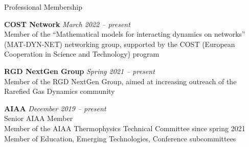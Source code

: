 \documentclass{resume} %
\begin{document}
\begin{rSection}{Professional Membership}


{\bf COST Network} \hfill {\em March 2022 -- present} \\ 
Member of the ``Mathematical models for interacting dynamics on networks'' (MAT-DYN-NET) networking group, supported by the COST (European Cooperation in Science and Technology) program


{\bf RGD NextGen Group} \hfill {\em Spring 2021 -- present} \\ 
Member of the RGD NextGen Group, aimed at increasing outreach of the Rarefied Gas Dynamics community

{\bf AIAA} \hfill {\em December 2019 -- present} \\ 
Senior AIAA Member \\
Member of the AIAA Thermophysics Technical Committee since spring 2021 \\
Member of Education, Emerging Technologies, Conference subcommittees
\end{rSection}
\newpage
\end{document}
